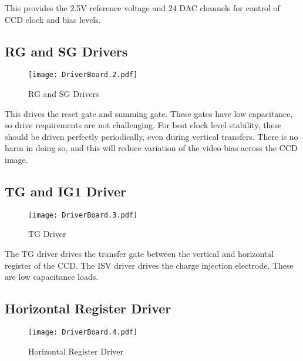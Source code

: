 This provides the 2.5V reference voltage and 24 DAC channels for control of CCD clock and bias levels.
  


\subsection{RG and SG Drivers}
   \begin{figure}
   \begin{center}
   \texttt{[image: DriverBoard.2.pdf]}
   \end{center}
   \caption{RG and SG Drivers}
   \end{figure}

This drives the reset gate and summing gate. These gates have low capacitance, so drive requirements are not challenging. For best clock level stability, these should be driven perfectly periodically, even during vertical transfers. There is no harm in doing so, and this will reduce variation of the video bias across the CCD image.
  


\subsection{TG and IG1 Driver}
   \begin{figure}
   \begin{center}
   \texttt{[image: DriverBoard.3.pdf]}
   \end{center}
   \caption{TG Driver}
   \end{figure}
   
The TG driver drives the transfer gate between the vertical and horizontal register of the CCD. The ISV driver drives the charge injection electrode. These are low capacitance loads.
  


\subsection{Horizontal Register Driver}
   \begin{figure}
   \begin{center}
   \texttt{[image: DriverBoard.4.pdf]}
   \end{center}
   \caption{Horizontal Register Driver}
   \end{figure}
   
